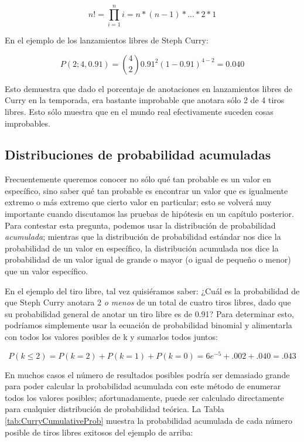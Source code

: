 \documentclass[
  12pt,
]{book}
\theoremstyle{definition}
\theoremstyle{definition}
\theoremstyle{definition}
\theoremstyle{remark}
\begin{document}
\[
n! = \prod_{i=1}^n i = n*(n-1)*...*2*1 
\]

En el ejemplo de los lanzamientos libres de Steph Curry:

\[
P(2;4,0.91) = \binom{4}{2} 0.91^2(1-0.91)^{4-2} = 0.040
\]

Esto demuestra que dado el porcentaje de anotaciones en lanzamientos libres de Curry en la temporada, era bastante improbable que anotara sólo 2 de 4 tiros libres. Esto sólo muestra que en el mundo real efectivamente suceden cosas improbables.

\hypertarget{distribuciones-de-probabilidad-acumuladas}{%
\subsection{Distribuciones de probabilidad acumuladas}\label{distribuciones-de-probabilidad-acumuladas}}

Frecuentemente queremos conocer no sólo qué tan probable es un valor en específico, sino saber qué tan probable es encontrar un valor que es igualmente extremo o más extremo que cierto valor en particular; esto se volverá muy importante cuando discutamos las pruebas de hipótesis en un capítulo posterior. Para contestar esta pregunta, podemos usar la distribución de probabilidad \emph{acumulada}; mientras que la distribución de probabilidad estándar nos dice la probabilidad de un valor en específico, la distribución acumulada nos dice la probabilidad de un valor igual de grande o mayor (o igual de pequeño o menor) que un valor específico.

En el ejemplo del tiro libre, tal vez quisiéramos saber: ¿Cuál es la probabilidad de que Steph Curry anotara 2 \emph{o menos} de un total de cuatro tiros libres, dado que su probabilidad general de anotar un tiro libre es de 0.91? Para determinar esto, podríamos simplemente usar la ecuación de probabilidad binomial y alimentarla con todos los valores posibles de k y sumarlos todos juntos:

\[
P(k\le2)= P(k=2) + P(k=1) + P(k=0) = 6e^{-5} + .002 + .040 = .043  
\]

En muchos casos el número de resultados posibles podría ser demasiado grande para poder calcular la probabilidad acumulada con este método de enumerar todos los valores posibles; afortunadamente, puede ser calculado directamente para cualquier distribución de probabilidad teórica. La Tabla \ref{tab:CurryCumulativeProb} muestra la probabilidad acumulada de cada número posible de tiros libres exitosos del ejemplo de arriba:
\end{document}
